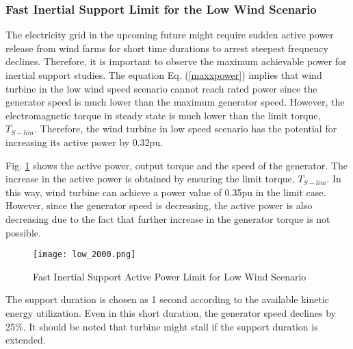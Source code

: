 \subsubsection{Fast Inertial Support Limit for the Low Wind Scenario}
The electricity grid in the upcoming future might require sudden active power release from wind farms for short time durations to arrest steepest frequency declines. Therefore, it is important to observe the maximum achievable power for inertial support studies. The equation Eq. (\ref{maxxpower}) implies that wind turbine in the low wind speed scenario cannot reach rated power since the generator speed is much lower than the maximum generator speed. However, the electromagnetic torque in steady state is much lower than the limit torque, $T_{S-lim}$. Therefore, the wind turbine in low speed scenario has the potential for increasing its active power by 0.32pu.\par
Fig. \ref{low_limit_power} shows the active power, output torque and the speed of the generator. The increase in the active power is obtained by ensuring the limit torque, $T_{S-lim}$. In this way, wind turbine can achieve a power value of 0.35pu in the limit case. However, since the generator speed is decreasing, the active power is also decreasing due to the fact that further increase in the generator torque is not possible. \par
\begin{figure}[h]
	\centering
	\texttt{[image: low\_2000.png]}
	\caption{Fast Inertial Support Active Power Limit for Low Wind Scenario}
	\label{low_limit_power}
\end{figure}
The support duration is chosen as 1 second according to the available kinetic energy utilization. Even in this short duration, the generator speed declines by 25\%. It should be noted that turbine might stall if the support duration is extended. \par
